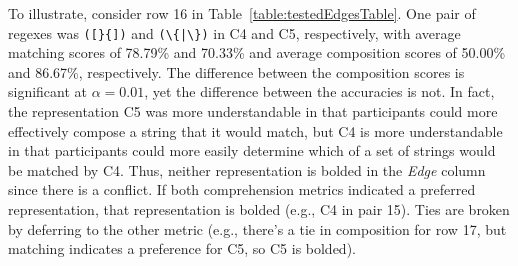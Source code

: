 
To illustrate, consider row 16 in Table~\ref{table:testedEdgesTable}.
One pair of regexes was \verb!([}{])! and \verb!(\{|\})! in C4 and C5, respectively, with average matching scores of 78.79\% and 70.33\% and average composition scores of 50.00\% and 86.67\%, respectively.
The difference between the composition scores is significant at $\alpha = 0.01$, yet the difference between the accuracies is not.
In fact, the representation C5 was more understandable in that participants could more effectively compose a string that it would match, but C4 is more understandable in that participants could more easily determine which of a set of strings would be matched by C4. Thus, neither representation is bolded in the \emph{Edge} column since there is a conflict.
If both comprehension metrics indicated a preferred representation, that representation is bolded (e.g., C4 in pair 15). Ties are broken by deferring to the other metric (e.g., there's a tie in composition for row 17, but matching indicates a preference for C5, so C5 is bolded).


%

